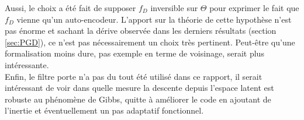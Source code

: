 \documentclass[hidelinks, french]{article} %
\theoremstyle{enonce}
\theoremstyle{special}
\theoremstyle{rq}
\theoremstyle{exo}
\theoremstyle{demo}
\begin{document}
Aussi, le choix a été fait de supposer $f_D$ inversible sur $\Theta$ pour exprimer le fait que $f_D$ vienne qu'un auto-encodeur. L'apport sur la théorie de cette hypothèse n'est pas énorme et sachant la dérive observée dans les derniers résultats (section \ref{sec:PGD}), ce n'est pas nécessairement un choix très pertinent. Peut-être qu'une formalisation moins dure, pas exemple en terme de voisinage, serait plus intéressante.
\\
Enfin, le filtre porte n'a pas du tout été utilisé dans ce rapport, il serait intéressant de voir dans quelle mesure la descente depuis l'espace latent est robuste au phénomène de Gibbs, quitte à améliorer le code en ajoutant de l’inertie et éventuellement un pas adaptatif fonctionnel.




\newpage
\end{document}
